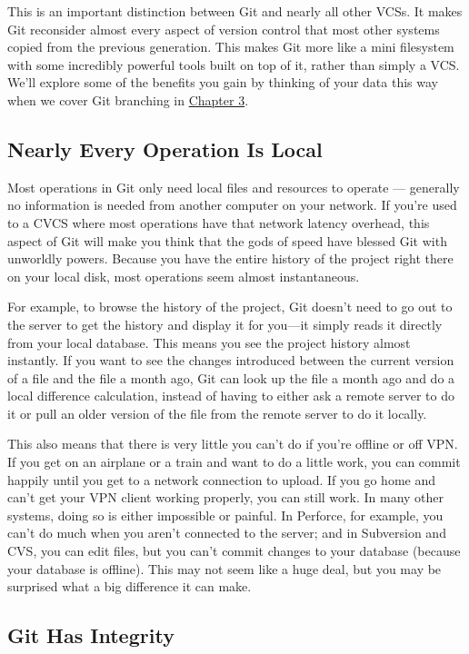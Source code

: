 \documentclass[a4paper]{book}
\newcounter{tab}[chapter]
\newcommand{\prechap}{Chapter }
\newcommand{\postchap}{}
\newcommand{\chapref}[1]{\hyperref[chap:#1]{\prechap #1\postchap}}
\begin{document}
This is an important distinction between Git and nearly all other VCSs. It makes Git reconsider almost every aspect of version control that most other systems copied from the previous generation. This makes Git more like a mini filesystem with some incredibly powerful tools built on top of it, rather than simply a VCS. We'll explore some of the benefits you gain by thinking of your data this way when we cover Git branching in \chapref{3}.

\subsection{Nearly Every Operation Is Local}\label{nearly-every-operation-is-local}

Most operations in Git only need local files and resources to operate --- generally no information is needed from another computer on your network. If you're used to a CVCS where most operations have that network latency overhead, this aspect of Git will make you think that the gods of speed have blessed Git with unworldly powers. Because you have the entire history of the project right there on your local disk, most operations seem almost instantaneous.

For example, to browse the history of the project, Git doesn't need to go out to the server to get the history and display it for you---it simply reads it directly from your local database. This means you see the project history almost instantly. If you want to see the changes introduced between the current version of a file and the file a month ago, Git can look up the file a month ago and do a local difference calculation, instead of having to either ask a remote server to do it or pull an older version of the file from the remote server to do it locally.

This also means that there is very little you can't do if you're offline or off VPN. If you get on an airplane or a train and want to do a little work, you can commit happily until you get to a network connection to upload. If you go home and can't get your VPN client working properly, you can still work. In many other systems, doing so is either impossible or painful. In Perforce, for example, you can't do much when you aren't connected to the server; and in Subversion and CVS, you can edit files, but you can't commit changes to your database (because your database is offline). This may not seem like a huge deal, but you may be surprised what a big difference it can make.

\subsection{Git Has Integrity}\label{git-has-integrity}
\end{document}
